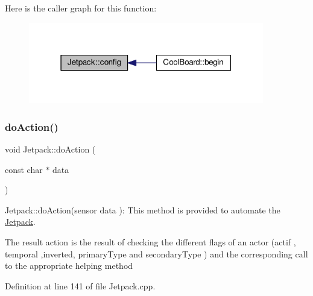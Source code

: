 Here is the caller graph for this function\+:\nopagebreak
\begin{figure}[H]
\begin{center}
\leavevmode
\includegraphics[width=291pt]{df/d1d/class_jetpack_ab065ee83e244265a2223a22f3ee4a719_icgraph}
\end{center}
\end{figure}
\mbox{\label{class_jetpack_a9e703197093094b963f9ad57817495b8}} 
\subsubsection{\texorpdfstring{do\+Action()}{doAction()}}
{\footnotesize\ttfamily void Jetpack\+::do\+Action (\begin{DoxyParamCaption}\item[{const char $\ast$}]{data }\end{DoxyParamCaption})}

Jetpack\+::do\+Action(sensor data )\+: This method is provided to automate the \hyperlink{class_jetpack}{Jetpack}.

The result action is the result of checking the different flags of an actor (actif , temporal ,inverted, primary\+Type and secondary\+Type ) and the corresponding call to the appropriate helping method 

Definition at line 141 of file Jetpack.\+cpp.


